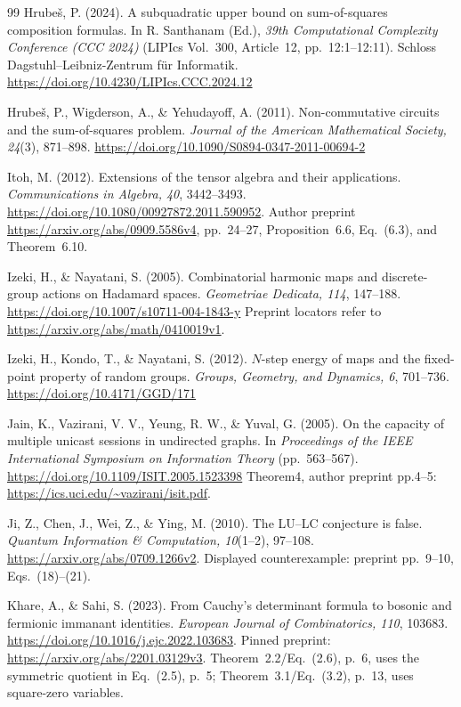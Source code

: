 \begin{thebibliography}{99}
Hrube\v{s}, P. (2024). A subquadratic upper bound on sum-of-squares
composition formulas. In R. Santhanam (Ed.), \emph{39th Computational
Complexity Conference (CCC 2024)} (LIPIcs Vol.~300, Article~12,
pp.~12:1--12:11). Schloss Dagstuhl--Leibniz-Zentrum f\"ur Informatik.
\url{https://doi.org/10.4230/LIPIcs.CCC.2024.12}

Hrube\v{s}, P., Wigderson, A., \& Yehudayoff, A. (2011).
Non-commutative circuits and the sum-of-squares problem.
\emph{Journal of the American Mathematical Society, 24}(3), 871--898.
\url{https://doi.org/10.1090/S0894-0347-2011-00694-2}

Itoh, M. (2012). Extensions of the tensor algebra and their applications.
\emph{Communications in Algebra, 40}, 3442--3493.
\url{https://doi.org/10.1080/00927872.2011.590952}.
Author preprint \url{https://arxiv.org/abs/0909.5586v4},
pp.~24--27, Proposition~6.6, Eq.~(6.3), and Theorem~6.10.

Izeki, H., \& Nayatani, S. (2005).
Combinatorial harmonic maps and discrete-group actions on Hadamard spaces.
\emph{Geometriae Dedicata, 114}, 147--188.
\url{https://doi.org/10.1007/s10711-004-1843-y}
Preprint locators refer to \url{https://arxiv.org/abs/math/0410019v1}.

Izeki, H., Kondo, T., \& Nayatani, S. (2012).
$N$-step energy of maps and the fixed-point property of random groups.
\emph{Groups, Geometry, and Dynamics, 6}, 701--736.
\url{https://doi.org/10.4171/GGD/171}

Jain, K., Vazirani, V. V., Yeung, R. W., \& Yuval, G. (2005).
On the capacity of multiple unicast sessions in undirected graphs.
In \emph{Proceedings of the IEEE International Symposium on Information Theory}
(pp.~563--567). \url{https://doi.org/10.1109/ISIT.2005.1523398}
Theorem4, author preprint pp.4--5:
\url{https://ics.uci.edu/~vazirani/isit.pdf}.

Ji, Z., Chen, J., Wei, Z., \& Ying, M. (2010).
The LU--LC conjecture is false.
\emph{Quantum Information \& Computation, 10}(1--2), 97--108.
\url{https://arxiv.org/abs/0709.1266v2}.
Displayed counterexample: preprint pp.~9--10, Eqs.~(18)--(21).

Khare, A., \& Sahi, S. (2023).
From Cauchy's determinant formula to bosonic and fermionic immanant identities.
\emph{European Journal of Combinatorics, 110}, 103683.
\url{https://doi.org/10.1016/j.ejc.2022.103683}.
Pinned preprint: \url{https://arxiv.org/abs/2201.03129v3}.
Theorem~2.2/Eq.~(2.6), p.~6, uses the symmetric quotient in Eq.~(2.5), p.~5;
Theorem~3.1/Eq.~(3.2), p.~13, uses square-zero variables.


\end{thebibliography}
